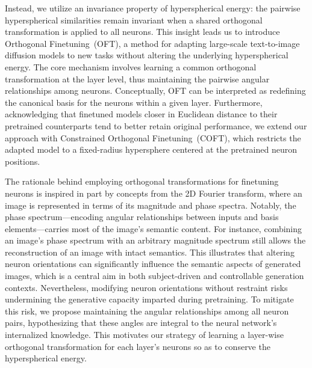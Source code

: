 Instead, we utilize an invariance property of hyperspherical energy: the pairwise hyperspherical similarities remain invariant when a shared orthogonal transformation is applied to all neurons. This insight leads us to introduce Orthogonal Finetuning~(OFT), a method for adapting large-scale text-to-image diffusion models to new tasks without altering the underlying hyperspherical energy. The core mechanism involves learning a common orthogonal transformation at the layer level, thus maintaining the pairwise angular relationships among neurons. Conceptually, OFT can be interpreted as redefining the canonical basis for the neurons within a given layer. Furthermore, acknowledging that finetuned models closer in Euclidean distance to their pretrained counterparts tend to better retain original performance, we extend our approach with Constrained Orthogonal Finetuning~(COFT), which restricts the adapted model to a fixed-radius hypersphere centered at the pretrained neuron positions.

The rationale behind employing orthogonal transformations for finetuning neurons is inspired in part by concepts from the 2D Fourier transform, where an image is represented in terms of its magnitude and phase spectra. Notably, the phase spectrum—encoding angular relationships between inputs and basis elements—carries most of the image’s semantic content. For instance, combining an image’s phase spectrum with an arbitrary magnitude spectrum still allows the reconstruction of an image with intact semantics. This illustrates that altering neuron orientations can significantly influence the semantic aspects of generated images, which is a central aim in both subject-driven and controllable generation contexts. Nevertheless, modifying neuron orientations without restraint risks undermining the generative capacity imparted during pretraining. To mitigate this risk, we propose maintaining the angular relationships among all neuron pairs, hypothesizing that these angles are integral to the neural network's internalized knowledge. This motivates our strategy of learning a layer-wise orthogonal transformation for each layer's neurons so as to conserve the hyperspherical energy.

